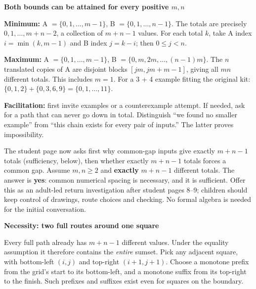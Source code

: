 \documentclass[11pt]{article}
\newcommand{\heading}[1]{\vspace{4pt}{\large\bfseries #1}\par}
\newcommand{\sub}[1]{\textbf{#1}\par}
\newcommand{\sset}[1]{\{#1\}}
\begin{document}
\sub{Both bounds can be attained for every positive $m,n$}
\textbf{Minimum:} A $=\sset{0,1,\ldots,m-1}$, B $=\sset{0,1,\ldots,n-1}$. The totals are precisely $0,1,\ldots,m+n-2$, a collection of $m+n-1$ values. For each total $k$, take A index $i=\min(k,m-1)$ and B index $j=k-i$; then $0\leq j<n$.

\textbf{Maximum:} A $=\sset{0,1,\ldots,m-1}$, B $=\sset{0,m,2m,\ldots,(n-1)m}$. The $n$ translated copies of A are disjoint blocks $[jm,jm+m-1]$, giving all $mn$ different totals. This includes $m=1$. For a 3 + 4 example fitting the original kit: $\sset{0,1,2}+\sset{0,3,6,9}=\sset{0,1,\ldots,11}$.

\textbf{Facilitation:} first invite examples or a counterexample attempt. If needed, ask for a path that can never go down in total. Distinguish ``we found no smaller example'' from ``this chain exists for every pair of inputs.'' The latter proves impossibility.
\newpage

\heading{Problem 10: the complete inverse argument}
The student page now asks first why common-gap inputs give exactly $m+n-1$ totals (sufficiency, below), then whether exactly $m+n-1$ totals forces a common gap. Assume $m,n\geq2$ and \textbf{exactly} $m+n-1$ different totals. The answer is \textbf{yes}: common numerical spacing is necessary, and it is sufficient. Offer this as an adult-led return investigation after student pages 8--9; children should keep control of drawings, route choices and checking. No formal algebra is needed for the initial conversation.

\sub{Necessity: two full routes around one square}
Every full path already has $m+n-1$ different values. Under the equality assumption it therefore contains the \emph{entire} sumset. Pick any adjacent square, with bottom-left $(i,j)$ and top-right $(i+1,j+1)$. Choose a monotone prefix from the grid's start to its bottom-left, and a monotone suffix from its top-right to the finish. Such prefixes and suffixes exist even for squares on the boundary.

\begin{center}
\end{center}
\end{document}
